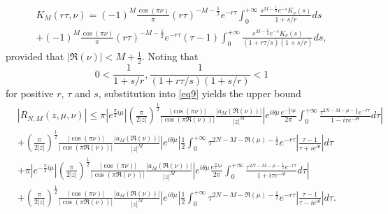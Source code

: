 \documentclass[a4paper,twoside,10pt]{amsart}
\numberwithin{equation}{section}
\begin{document}
\begin{multline*}
K_M \left( {r\tau ,\nu } \right) = \left( { - 1} \right)^M \frac{{\cos \left( {\pi \nu } \right)}}{\pi }\left( {r\tau } \right)^{ - M - \frac{1}{2}} e^{ - r\tau } \int_0^{ + \infty } {\frac{{s^{M - \frac{1}{2}} e^{ - s} K_\nu  \left( s \right)}}{{1 + s/r}}ds} \\ + \left( { - 1} \right)^M \frac{{\cos \left( {\pi \nu } \right)}}{\pi }\left( {r\tau } \right)^{ - M - \frac{1}{2}} e^{ - r\tau } \left( {\tau  - 1} \right)\int_0^{ + \infty } {\frac{{s^{M - \frac{1}{2}} e^{ - s} K_\nu  \left( s \right)}}{{\left( {1 + r\tau /s} \right)\left( {1 + s/r} \right)}}ds} ,
\end{multline*}
provided that $\left| {\Re \left( \nu  \right)} \right| < M + \frac{1}{2}$. Noting that
\[
0 < \frac{1}{{1 + s/r}},\frac{1}{{\left( 1 + r\tau /s \right)\left( {1 + s/r} \right)}} < 1
\]
for positive $r$, $\tau$ and $s$, substitution into \eqref{eq9} yields the upper bound
\begin{align*}
& \left| {R_{N,M} \left( {z,\mu ,\nu } \right)} \right| \le  \pi \left| {e^{\frac{\pi }{2}i\mu } } \right|\left( {\frac{\pi }{{2\left| z \right|}}} \right)^{\frac{1}{2}} \frac{{\left| {\cos \left( {\pi \nu } \right)} \right|}}{{\left| {\cos \left( {\pi \Re \left( \nu  \right)} \right)} \right|}}\frac{{\left| {a_M \left( \Re\left(\nu \right) \right)} \right|}}{{\left| z \right|^M }}\left| {e^{i\theta \mu } \frac{{e^{ - \frac{\pi }{2}i\mu } }}{{2\pi }}\int_0^{ + \infty } {\frac{{\tau ^{2N - M - \mu  - \frac{1}{2}} e^{ - r\tau } }}{{1 - i\tau e^{ - i\theta } }}d\tau } } \right|\\
& +  \left( {\frac{\pi }{{2\left| z \right|}}} \right)^{\frac{1}{2}} \frac{{\left| {\cos \left( {\pi \nu } \right)} \right|}}{{\left| {\cos \left( {\pi \Re \left( \nu  \right)} \right)} \right|}}\frac{{\left| {a_M \left( \Re\left(\nu \right) \right)} \right|}}{{\left| z \right|^M }}\left| {e^{i\theta \mu } } \right|\frac{1}{{2 }}\int_0^{ + \infty } {\tau ^{2N - M - \Re \left( \mu  \right) - \frac{1}{2}} e^{ - r\tau } \left| {\frac{{\tau  - 1}}{{\tau  + ie^{i\theta } }}} \right|d\tau } \\
& + \pi \left| {e^{ - \frac{\pi }{2}i\mu } } \right|\left( {\frac{\pi }{{2\left| z \right|}}} \right)^{\frac{1}{2}} \frac{{\left| {\cos \left( {\pi \nu } \right)} \right|}}{{\left| {\cos \left( {\pi \Re \left( \nu  \right)} \right)} \right|}}\frac{{\left| {a_M \left( \Re\left(\nu \right)  \right)} \right|}}{{\left| z \right|^M }}\left| {e^{i\theta \mu } \frac{e^{\frac{\pi }{2}i\mu }}{{2\pi }}\int_0^{ + \infty } {\frac{{\tau ^{2N - M - \mu  - \frac{1}{2}} e^{ - r\tau } }}{{1 + i\tau e^{ - i\theta } }}d\tau } } \right| \\
& + \left( {\frac{\pi }{{2\left| z \right|}}} \right)^{\frac{1}{2}} \frac{{\left| {\cos \left( {\pi \nu } \right)} \right|}}{{\left| {\cos \left( {\pi \Re \left( \nu  \right)} \right)} \right|}}\frac{{\left| {a_M \left( \Re\left(\nu \right)  \right)} \right|}}{{\left| z \right|^M }}\left| {e^{i\theta \mu }    } \right|\frac{1}{{2 }}\int_0^{ + \infty } {\tau ^{2N - M - \Re \left( \mu  \right) - \frac{1}{2}} e^{ - r\tau } \left| {\frac{{\tau  - 1}}{{\tau  - ie^{i\theta } }}} \right|d\tau } .
\end{align*}
\end{document}
